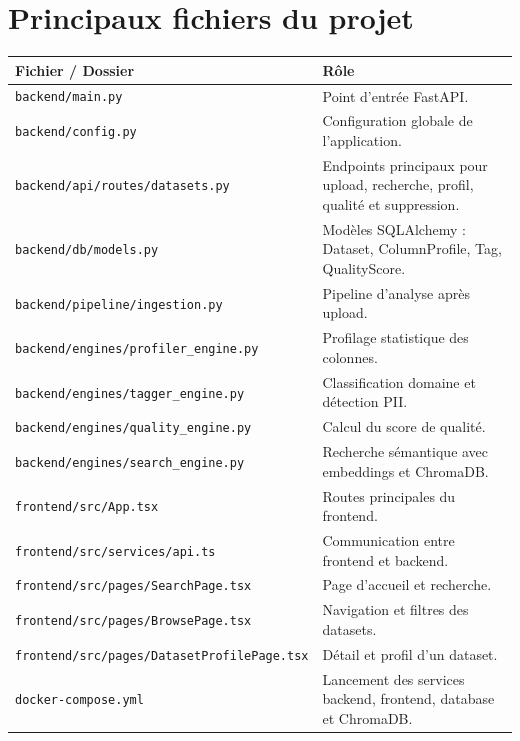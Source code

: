\documentclass[12pt,a4paper]{report}
\begin{document}
\appendix
\chapter{Principaux fichiers du projet}

\begin{longtable}{p{5cm}p{9cm}}
\toprule
\textbf{Fichier / Dossier} & \textbf{Rôle} \\
\midrule
\texttt{backend/main.py} & Point d'entrée FastAPI. \\
\texttt{backend/config.py} & Configuration globale de l'application. \\
\texttt{backend/api/routes/datasets.py} & Endpoints principaux pour upload, recherche, profil, qualité et suppression. \\
\texttt{backend/db/models.py} & Modèles SQLAlchemy : Dataset, ColumnProfile, Tag, QualityScore. \\
\texttt{backend/pipeline/ingestion.py} & Pipeline d'analyse après upload. \\
\texttt{backend/engines/profiler\_engine.py} & Profilage statistique des colonnes. \\
\texttt{backend/engines/tagger\_engine.py} & Classification domaine et détection PII. \\
\texttt{backend/engines/quality\_engine.py} & Calcul du score de qualité. \\
\texttt{backend/engines/search\_engine.py} & Recherche sémantique avec embeddings et ChromaDB. \\
\texttt{frontend/src/App.tsx} & Routes principales du frontend. \\
\texttt{frontend/src/services/api.ts} & Communication entre frontend et backend. \\
\texttt{frontend/src/pages/SearchPage.tsx} & Page d'accueil et recherche. \\
\texttt{frontend/src/pages/BrowsePage.tsx} & Navigation et filtres des datasets. \\
\texttt{frontend/src/pages/DatasetProfilePage.tsx} & Détail et profil d'un dataset. \\
\texttt{docker-compose.yml} & Lancement des services backend, frontend, database et ChromaDB. \\
\bottomrule
\end{longtable}
\end{document}
